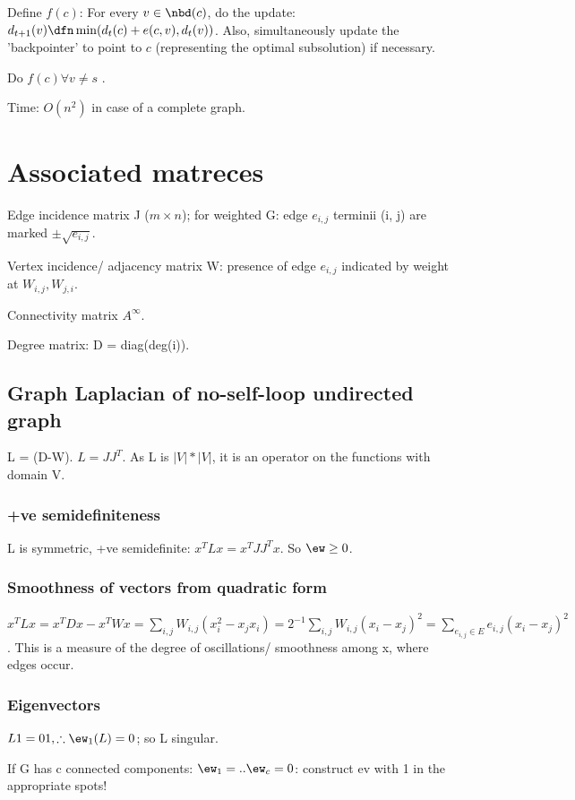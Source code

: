 \documentclass[oneside, article]{memoir}
\begin{document}
Define $f(c)$: For every $v \in \nbd(c)$, do the update: $d_{t+1}(v) \dfn \min(d_{t}(c) + e(c, v), d_{t}(v))$. Also, simultaneously update the 'backpointer' to point to $c$ (representing  the optimal subsolution) if necessary.

Do $f(c) \forall v \neq s$ .

Time: $O(n^{2})$ in case of a complete graph.

\section{Associated matreces}
Edge incidence matrix J ($m \times n$); for weighted G: edge $e_{i, j}$ terminii (i, j) are marked $ \pm \sqrt{e_{i,j}}$.

Vertex incidence/ adjacency matrix W: presence of edge $e_{i,j}$ indicated by weight at $W_{i,j}, W_{j,i}$.

Connectivity matrix $A^{\infty}$.

Degree matrix: D = diag(deg(i)).

\subsection{Graph Laplacian of no-self-loop undirected graph}
L = (D-W). $L = JJ^{T}$. As L is $|V|*|V|$, it is an operator on the functions with domain V.

\subsubsection{+ve semidefiniteness}
L is symmetric, +ve semidefinite: $x^{T}Lx = x^{T}JJ^{T}x$. So $\ew \geq 0$.

\subsubsection{Smoothness of vectors from quadratic form}
$x^{T}Lx = x^{T}Dx - x^{T}Wx = \sum_{i,j} W_{i,j} (x_i^{2} - x_j x_i) =  2^{-1}\sum_{i,j} W_{i,j} (x_{i} - x_{j})^{2} = \sum_{e_{i,j} \in E} e_{i,j} (x_{i} - x_{j})^{2}$. This is a measure of the degree of oscillations/ smoothness among x, where edges occur.

\subsubsection{Eigenvectors}
$L1 = 01, \therefore \ew_{1}(L)=0$; so L singular.

If G has c connected components: $\ew_{1}= .. \ew_{c} = 0$: construct ev with 1 in the appropriate spots!
\end{document}
